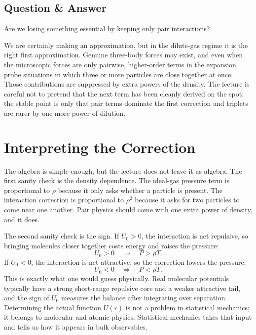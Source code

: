 \subsection{Question \& Answer}

Are we losing something essential by keeping only pair interactions?

We are certainly making an approximation, but in the dilute-gas regime it is the right first approximation. Genuine three-body forces may exist, and even when the microscopic forces are only pairwise, higher-order terms in the expansion probe situations in which three or more particles are close together at once. Those contributions are suppressed by extra powers of the density. The lecture is careful not to pretend that the next term has been cleanly derived on the spot; the stable point is only that pair terms dominate the first correction and triplets are rarer by one more power of dilution.

\section{Interpreting the Correction}

The algebra is simple enough, but the lecture does not leave it as algebra. The first sanity check is the density dependence. The ideal-gas pressure term is proportional to \(\rho\) because it only asks whether a particle is present. The interaction correction is proportional to \(\rho^2\) because it asks for two particles to come near one another. Pair physics should come with one extra power of density, and it does.

The second sanity check is the sign. If \(U_0>0\), the interaction is net repulsive, so bringing molecules closer together costs energy and raises the pressure:
\begin{equation}
U_0>0 \quad \Longrightarrow \quad P>\rho T.
\end{equation}
If \(U_0<0\), the interaction is net attractive, so the correction lowers the pressure:
\begin{equation}
U_0<0 \quad \Longrightarrow \quad P<\rho T.
\end{equation}
This is exactly what one would guess physically. Real molecular potentials typically have a strong short-range repulsive core and a weaker attractive tail, and the sign of \(U_0\) measures the balance after integrating over separation. Determining the actual function \(U(r)\) is not a problem in statistical mechanics; it belongs to molecular and atomic physics. Statistical mechanics takes that input and tells us how it appears in bulk observables.

